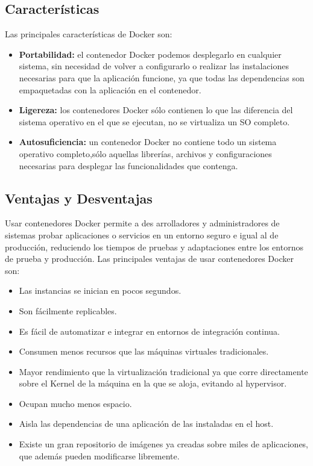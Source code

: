 \documentclass[preprint,12pt]{elsarticle}
\begin{document}
\subsection{\textbf{Características}}
Las principales características de Docker son:


\begin{itemize}
\item \textbf{Portabilidad:} el contenedor Docker podemos desplegarlo en cualquier sistema, sin necesidad de volver a configurarlo o realizar las instalaciones necesarias para que la aplicación funcione, ya que todas las dependencias son empaquetadas con la aplicación en el contenedor.

\item \textbf{Ligereza:} los contenedores Docker sólo contienen lo que las diferencia del sistema operativo en el que se ejecutan, no se virtualiza un SO completo.

\item \textbf{Autosuficiencia:} un contenedor Docker no contiene todo un sistema operativo completo,sólo aquellas librerías, archivos y configuraciones necesarias para desplegar las funcionalidades que contenga.

\end{itemize}

\subsection{\textbf{Ventajas y Desventajas}}
Usar contenedores Docker permite a des arrolladores y administradores de sistemas probar aplicaciones o servicios en un entorno seguro e igual al de producción, reduciendo los tiempos de pruebas y adaptaciones entre los entornos de prueba y producción. Las principales ventajas de usar contenedores Docker son:

\begin{itemize}
\item Las instancias se inician en pocos segundos.
\item Son fácilmente replicables.
\item Es fácil de automatizar e integrar en entornos de integración continua.
\item Consumen menos recursos que las máquinas virtuales tradicionales.
\item Mayor rendimiento que la virtualización tradicional ya que corre directamente sobre el Kernel de la máquina en la que se aloja, evitando al hypervisor.
\item Ocupan mucho menos espacio.
\item Aisla las dependencias de una aplicación de las instaladas en el host.
\item Existe un gran repositorio de imágenes ya creadas sobre miles de aplicaciones, que además pueden modificarse libremente.

\end{itemize}
\end{document}
